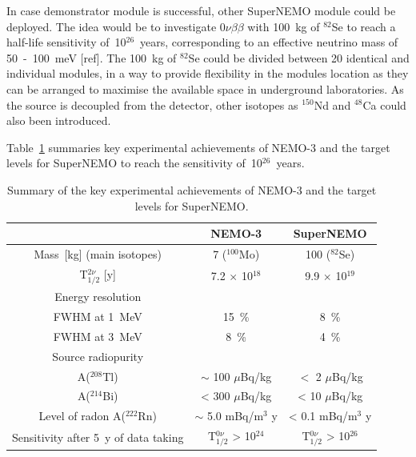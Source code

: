 \documentclass[main.tex]{subfiles}
\begin{document}
\bigskip


\NI In case demonstrator module is successful, other SuperNEMO module could be deployed. The idea would be to investigate 0$\nu\beta\beta$ with 100~kg of $^{\text{82}}$Se to reach a half-life sensitivity of~10$^{\text{26}}$~years, corresponding to an effective neutrino mass of 50~-~100~meV [ref]. The 100~kg of $^{\text{82}}$Se could be divided between 20 identical and individual modules, in a way to provide flexibility in the modules location as they can be arranged to maximise the available space in underground laboratories. As the source is decoupled from the detector, other isotopes as $^{\text{150}}$Nd and $^{\text{48}}$Ca could also been introduced.


\bigskip


\NI Table~\ref{tab:DifferenceNEMO3-SuperNEMO} summaries key experimental achievements of NEMO-3 and the target levels for SuperNEMO to reach the sensitivity of~10$^{\text{26}}$~years. 


\begin{table}[h!]
\centering
\begin{tabular}{c|c|c}
      & NEMO-3 & SuperNEMO \\
\toprule
Mass~[kg] (main isotopes)           & 7 ($^{\text{100}}$Mo)         & 100 ($^{\text{82}}$Se)        \\[0.1cm]
 T$_{\text{1/2}}^{\text{2}\nu}$ [y] & 7.2 $\times$ 10$^{\text{18}}$ & 9.9 $\times$ 10$^{\text{19}}$ \\[0.1cm]
\midrule
Energy resolution & & \\
FWHM at 1~MeV                       & 15~\%                         & 8~\%                          \\[0.1cm]
FWHM at 3~MeV                       & 8~\%                          & 4~\%                          \\[0.1cm]
\midrule
Source radiopurity & & \\
A($^{\text{208}}$Tl)               & $\sim$ 100 $\mu$Bq/kg         & $<$ 2 $\mu$Bq/kg               \\[0.1cm]
A($^{\text{214}}$Bi)               & < 300 $\mu$Bq/kg              & < 10 $\mu$Bq/kg                \\[0.1cm]
\midrule
Level of radon A($^{\text{222}}$Rn)& $\sim$ 5.0 mBq/m$^\text{3}$ y   & < 0.1 mBq/m$^\text{3}$ y     \\[0.1cm]
\midrule
Sensitivity after 5~y of data taking & T$_{\text{1/2}}^{\text{0}\nu}$ > 10$^{\text{24}}$ & T$_{\text{1/2}}^{\text{0}\nu}$ > 10$^{\text{26}}$     \\[0.1cm]
\bottomrule
\end{tabular}
\caption{Summary of the key experimental achievements of NEMO-3 and the target levels for SuperNEMO.}
\label{tab:DifferenceNEMO3-SuperNEMO}
\end{table}  


\FloatBarrier
\end{document}
